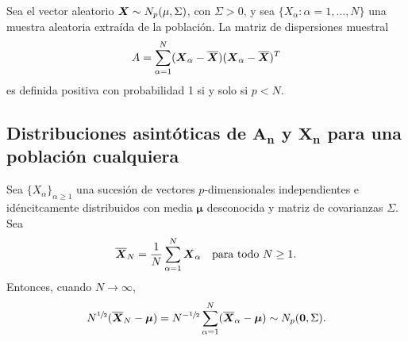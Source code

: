 \begin{nth}
  Sea el vector aleatorio $\boldsymbol{X} \sim N_p(\mu,\Sigma)$, con $\Sigma > 0$, y sea $\{X_\alpha : \alpha = 1,\dots,N\}$ una muestra aleatoria extraída de la población. La matriz de dispersiones muestral
  \[
    A = \sum_{\alpha = 1}^N (\boldsymbol{X}_\alpha - \overline{\boldsymbol{X}})(\boldsymbol{X}_\alpha - \overline{\boldsymbol{X}})^T
  \]
  es definida positiva con probabilidad 1 si y solo si $p<N$.
\end{nth}

\subsection{Distribuciones asintóticas de \texorpdfstring{$\boldsymbol A_{\boldsymbol n}$}{An} y \texorpdfstring{$\boldsymbol X_{\boldsymbol n}$}{Xn} para una población cualquiera}

\begin{nprop}
  Sea \(\{X_{\alpha}\}_{\alpha \geq 1}\) una sucesión de vectores \(p\)-dimensionales independientes e idéncitcamente distribuidos con media \(\boldsymbol \mu\) desconocida y matriz de covarianzas \(\Sigma\). Sea \[
    \overline{\boldsymbol{X}}_N = \frac{1}{N}\sum_{\alpha = 1}^{N}\boldsymbol{X}_{\alpha} \quad \text{para todo } N \geq 1.
  \]
  Entonces, cuando \(N \to \infty\), \[
    N^{\sfrac{1}{2}}(\overline{\boldsymbol{X}}_N - \boldsymbol \mu) = N^{-\sfrac{1}{2}}\sum_{\alpha = 1}^{N}(\overline{\boldsymbol{X}}_{\alpha} - \boldsymbol \mu) \sim N_p(\boldsymbol 0, \Sigma).
  \]
\end{nprop}

